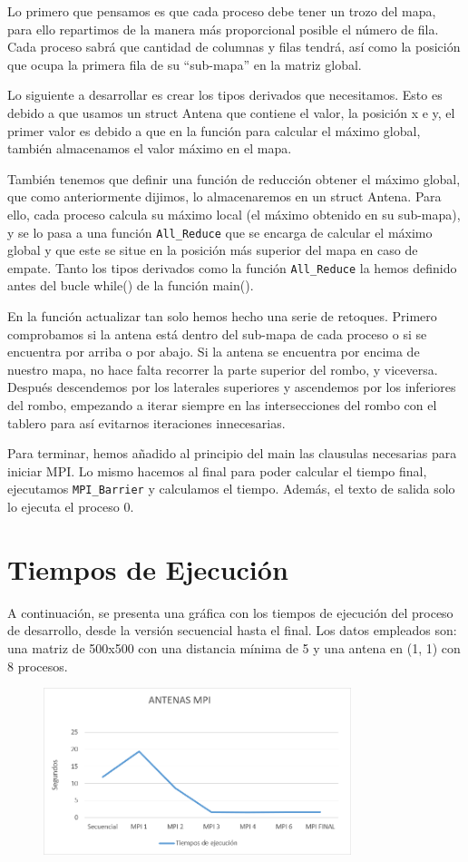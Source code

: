 \documentclass[8pt]{article}
\begin{document}
Lo primero que pensamos es que cada proceso debe tener un trozo del mapa, para ello repartimos de la manera más proporcional posible el número de fila. Cada proceso sabrá que cantidad de columnas y filas tendrá, así como la posición que ocupa la primera fila de su “sub-mapa” en la matriz global.

Lo siguiente a desarrollar es crear los tipos derivados que necesitamos. Esto es debido a que usamos un struct Antena que contiene el valor, la posición x e y, el primer valor es debido a que en la función para calcular el máximo global, también almacenamos el valor máximo en el mapa.

También tenemos que definir una función de reducción obtener el máximo global, que como anteriormente dijimos, lo almacenaremos en un struct Antena. Para ello, cada proceso calcula su máximo local (el máximo obtenido en su sub-mapa), y se lo pasa a una función \texttt{All\_Reduce} que se encarga de calcular el máximo global y que este se situe en la posición más superior del mapa en caso de empate. Tanto los tipos derivados como la función \texttt{All\_Reduce} la hemos definido antes del bucle while() de la función main().

En la función actualizar tan solo hemos hecho una serie de retoques. Primero comprobamos si la antena está dentro del sub-mapa de cada proceso o si se encuentra por arriba o por abajo. Si la antena se encuentra por encima de nuestro mapa, no hace falta recorrer la parte superior del rombo, y viceversa. Después descendemos por los laterales superiores y ascendemos por los inferiores del rombo, empezando a iterar siempre en las intersecciones del rombo con el tablero para así evitarnos iteraciones innecesarias.

Para terminar, hemos añadido al principio del main las clausulas necesarias para iniciar MPI. Lo mismo hacemos al final para poder calcular el tiempo final, ejecutamos \texttt{MPI\_Barrier} y calculamos el tiempo. Además, el texto de salida solo lo ejecuta el proceso 0.

\section{Tiempos de Ejecución}
A continuación, se presenta una gráfica con los tiempos de ejecución del proceso de desarrollo, desde la versión secuencial hasta el final. Los datos empleados son: una matriz de 500x500 con una distancia mínima de 5 y una antena en (1, 1) con 8 procesos.
\noindent
\begin{figure}[b]
\centering
\includegraphics[width=0.8\textwidth]{./grafico.png}
\end{figure}
\end{document}
